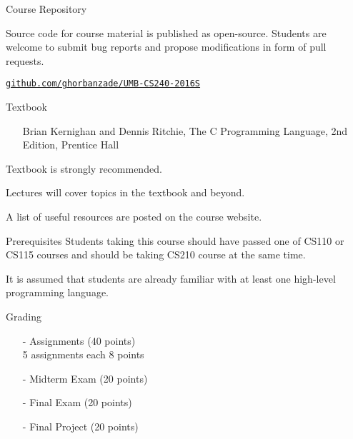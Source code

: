 \documentclass[compress]{beamer}
\begin{document}
\begin{slide}
	\begin{block}{Course Repository}

	Source code for course material is published as open-source.
	Students are welcome to submit bug reports and propose modifications in form of pull requests.

	\begin{center}
		\href{https://github.com/ghorbanzade/umb-cs240-2016s}{\texttt{github.com/ghorbanzade/UMB-CS240-2016S}}
	\end{center}

	\end{block}
\end{slide}

\begin{slide}
	\begin{block}{Textbook}
		\begin{itemize}
			\item[] Brian Kernighan and Dennis Ritchie, The C Programming Language, 2nd Edition, Prentice Hall
		\end{itemize}
		Textbook is \alert{strongly} recommended.

		Lectures will cover topics in the textbook and beyond.

		A list of useful resources are posted on the course website.
	\end{block}
\end{slide}

\begin{slide}
	\begin{block}{Prerequisites}
		Students taking this course should have passed one of CS110 or CS115 courses and should be taking CS210 course at the same time.
	
		It is assumed that students are already familiar with at least one high-level programming language.
	\end{block}
\end{slide}

\begin{slide}
	\begin{block}{Grading}
		\begin{itemize}
			\item[-] Assignments (40 points)\\5 assignments each 8 points
			\item[-] Midterm Exam (20 points)
			\item[-] Final Exam (20 points)
			\item[-] Final Project (20 points)
		\end{itemize}
	\end{block}
\end{slide}
\end{document}
